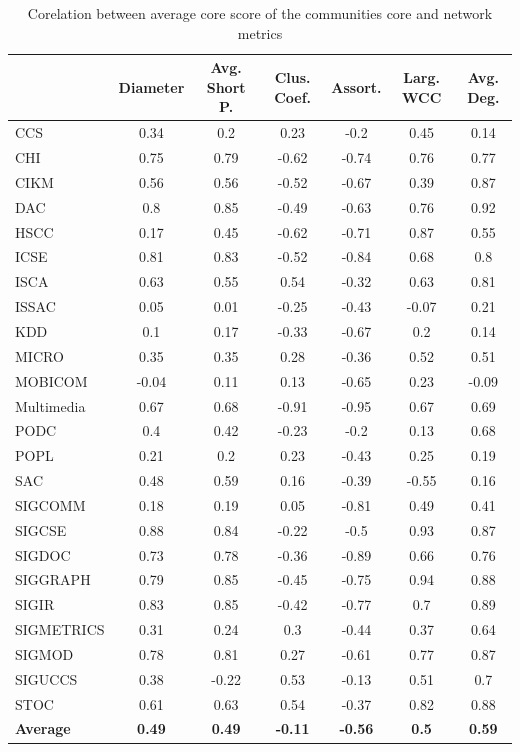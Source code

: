 \begin{table}[!htb]
\centering
\caption{Corelation between average core score of the communities core and network metrics}
\label{tab:correlation_metrics}
{\small
\begin{tabular}{|l|c|c|c|c|c|c|} \hline
& \bf Diameter & \bf Avg. Short P. & \bf Clus. Coef. & \bf Assort. & \bf Larg. WCC & \bf Avg. Deg. \\ \hline
CCS & 0.34 & 0.2 & 0.23 & -0.2 & 0.45 & 0.14 \\ \hline
CHI & 0.75 & 0.79 & -0.62 & -0.74 & 0.76 & 0.77 \\ \hline
CIKM & 0.56 & 0.56 & -0.52 & -0.67 & 0.39 & 0.87 \\ \hline
DAC & 0.8 & 0.85 & -0.49 & -0.63 & 0.76 & 0.92 \\ \hline
HSCC & 0.17 & 0.45 & -0.62 & -0.71 & 0.87 & 0.55 \\ \hline
ICSE & 0.81 & 0.83 & -0.52 & -0.84 & 0.68 & 0.8 \\ \hline
ISCA & 0.63 & 0.55 & 0.54 & -0.32 & 0.63 & 0.81  \\ \hline
ISSAC & 0.05 & 0.01 & -0.25 & -0.43 & -0.07 & 0.21 \\ \hline
KDD & 0.1 & 0.17 & -0.33 & -0.67 & 0.2 & 0.14\\ \hline
MICRO & 0.35 & 0.35 & 0.28 & -0.36 & 0.52 & 0.51 \\ \hline
MOBICOM & -0.04 & 0.11 & 0.13 & -0.65 & 0.23 & -0.09 \\ \hline
Multimedia & 0.67 & 0.68 & -0.91 & -0.95 & 0.67 & 0.69 \\ \hline
PODC & 0.4 & 0.42 & -0.23 & -0.2 & 0.13 & 0.68 \\ \hline
POPL & 0.21 & 0.2 & 0.23 & -0.43 & 0.25 & 0.19 \\ \hline
SAC & 0.48 & 0.59 & 0.16 & -0.39 & -0.55 & 0.16 \\ \hline
SIGCOMM & 0.18 & 0.19 & 0.05 & -0.81 & 0.49 & 0.41\\ \hline
SIGCSE & 0.88 & 0.84 & -0.22 & -0.5 & 0.93 & 0.87 \\ \hline
SIGDOC & 0.73 & 0.78 & -0.36 & -0.89 & 0.66 & 0.76 \\ \hline
SIGGRAPH & 0.79 & 0.85 & -0.45 & -0.75 & 0.94 & 0.88 \\ \hline
SIGIR & 0.83 & 0.85 & -0.42 & -0.77 & 0.7 & 0.89 \\ \hline
SIGMETRICS & 0.31 & 0.24 & 0.3 & -0.44 & 0.37 & 0.64 \\ \hline
SIGMOD & 0.78 & 0.81 & 0.27 & -0.61 & 0.77 & 0.87 \\ \hline
SIGUCCS & 0.38 & -0.22 & 0.53 & -0.13 & 0.51 & 0.7 \\ \hline
STOC & 0.61 & 0.63 & 0.54 & -0.37 & 0.82 & 0.88\\ \hline \hline
{\bf Average} & {\bf 0.49} & {\bf 0.49} & {\bf -0.11} & {\bf -0.56} & {\bf 0.5} & {\bf 0.59} \\ \hline
\end{tabular}
}
\end{table}



